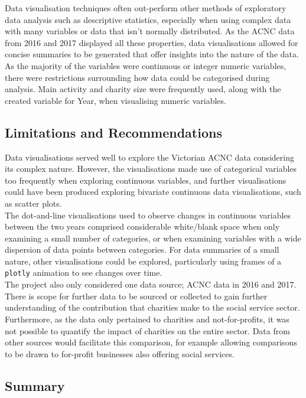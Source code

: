 \documentclass[
  11pt,
]{article}
\begin{document}
Data visualisation techniques often out-perform other methods of exploratory data analysis such as descriptive statistics, especially when using complex data with many variables or data that isn't normally distributed. As the ACNC data from 2016 and 2017 displayed all these properties, data visualisations allowed for concise summaries to be generated that offer insights into the nature of the data.\\
As the majority of the variables were continuous or integer numeric variables, there were restrictions surrounding how data could be categorised during analysis. Main activity and charity size were frequently used, along with the created variable for Year, when visualising numeric variables.

\hypertarget{limitations-and-recommendations}{%
\subsection{Limitations and Recommendations}\label{limitations-and-recommendations}}

Data visualisations served well to explore the Victorian ACNC data considering its complex nature. However, the visualisations made use of categorical variables too frequently when exploring continuous variables, and further visualisations could have been produced exploring bivariate continuous data visualisations, such as scatter plots.\\
The dot-and-line visualisations used to observe changes in continuous variables between the two years comprised considerable white/blank space when only examining a small number of categories, or when examining variables with a wide dispersion of data points between categories. For data summaries of a small nature, other visualisations could be explored, particularly using frames of a \texttt{plotly} animation to see changes over time.\\
The project also only considered one data source; ACNC data in 2016 and 2017. There is scope for further data to be sourced or collected to gain further understanding of the contribution that charities make to the social service sector. Furthermore, as the data only pertained to charities and not-for-profits, it was not possible to quantify the impact of charities on the entire sector. Data from other sources would facilitate this comparison, for example allowing comparisons to be drawn to for-profit businesses also offering social services.

\hypertarget{summary}{%
\subsection{Summary}\label{summary}}
\end{document}
